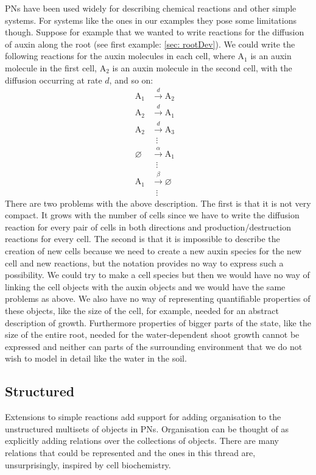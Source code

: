 PNs have been used widely for describing chemical reactions and other simple
systems. For systems like the ones in our examples they pose some limitations
though. Suppose for example that we wanted to write reactions for the diffusion
of auxin along the root (see first example: \ref{sec: rootDev}). We could write
the following reactions for the auxin molecules in each cell, where
$\mathrm{A}_1$ is an auxin molecule in the first cell, $\mathrm{A}_2$ is an
auxin molecule in the second cell, with the diffusion occurring at rate
$d$, and so on:
\begin{align*}
\mathrm{A}_1 &\xrightarrow{d} \mathrm{A}_2 \\
\mathrm{A}_2 &\xrightarrow{d} \mathrm{A}_1 \\
\mathrm{A}_2 &\xrightarrow{d} \mathrm{A}_3\\
 &  \hspace{6pt}  \vdots& \\
\varnothing & \xrightarrow{\alpha} \mathrm{A}_1 \\
 & \hspace{6pt}  \vdots &\\
\mathrm{A}_1 &\xrightarrow{\beta} \varnothing \\
  & \hspace{6pt}  \vdots 
\end{align*}
There are two problems with the above description. The first is that it is not
very compact. It grows with the number of cells since we have to write the
diffusion reaction for every pair of cells in both directions and
production/destruction reactions for every cell. The second is that it is
impossible to describe the creation of new cells because we need to create a new
auxin species for the new cell and new reactions, but the notation provides no
way to express such a possibility. We could try to make a cell species but then
we would have no way of linking the cell objects with the auxin objects and we
would have the same problems as above. We also have no way of representing
quantifiable properties of these objects, like the size of the cell, for
example, needed for an abstract description of growth. Furthermore properties of
bigger parts of the state, like the size of the entire root, needed for the
water-dependent shoot growth cannot be expressed and neither can parts of the
surrounding environment that we do not wish to model in detail like the water in
the soil.

\subsection{Structured}
\label{subsec:structLangs}
Extensions to simple reactions add support for adding organisation to the
unstructured multisets of objects in PNs. Organisation can be thought of as
explicitly adding relations over the collections of objects. There are many
relations that could be represented and the ones in this thread are,
unsurprisingly, inspired by cell biochemistry.

